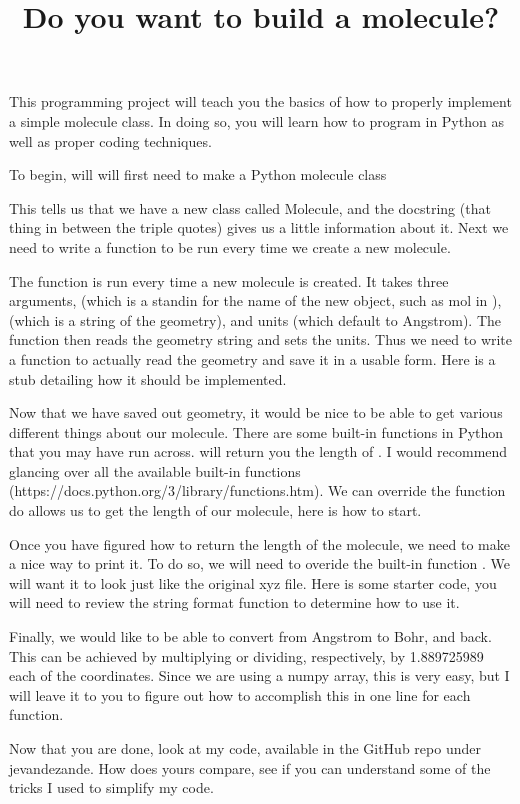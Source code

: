 \documentclass[11pt]{article}
\title{Do you want to build a molecule?}
\date{}
\begin{document}
\maketitle

This programming project will teach you the basics of how to properly implement
a simple molecule class. In doing so, you will learn how to program in Python
as well as proper coding techniques.

To begin, will will first need to make a Python molecule class


This tells us that we have a new class called Molecule, and the docstring (that
thing in between the triple quotes) gives us a little information about it. Next
we need to write a function to be run every time we create a new molecule.


The function  is run every time a new molecule is created.
It takes three arguments,  (which is a standin for the name of
the new object, such as mol in ),
 (which is a string of the geometry), and units (which
default to Angstrom). The function then reads the geometry string and sets the
units. Thus we need to write a function to actually read the geometry and save
it in a usable form. Here is a stub detailing how it should be implemented.


Now that we have saved out geometry, it would be nice to be able to get various
different things about our molecule. There are some built-in functions in Python
that you may have run across.  will return you the
length of . I would recommend glancing over all the
available built-in functions (https://docs.python.org/3/library/functions.htm).
We can override the function  do allows us to get the length
of our molecule, here is how to start.


Once you have figured how to return the length of the molecule, we need to make
a nice way to print it. To do so, we will need to overide the built-in function
. We will want it to look just like the original xyz file. Here is some
starter code, you will need to review the string format function to determine
how to use it.


Finally, we would like to be able to convert from Angstrom to Bohr, and back.
This can be achieved by multiplying or dividing, respectively, by 1.889725989
each of the coordinates. Since we are using a numpy array, this is very easy,
but I will leave it to you to figure out how to accomplish this in one line
for each function.

Now that you are done, look at my code, available in the GitHub repo under
jevandezande. How does yours compare, see if you can understand some of the
tricks I used to simplify my code.
\end{document}
